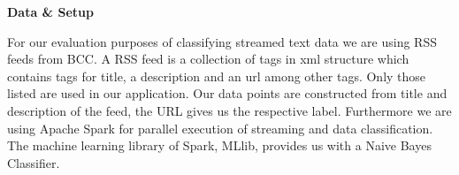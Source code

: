 \begin{center} \textbf{\huge Data \& Setup} \end{center}
For our evaluation purposes of classifying streamed text data we are using RSS feeds from BCC. A RSS feed is a collection of tags in xml structure which contains tags for title, a description and an url among other tags. Only those listed are used in our application. Our data points are constructed from title and description of the feed, the URL gives us the respective label. Furthermore we are using Apache Spark for parallel execution of streaming and data classification. The machine learning library of Spark, MLlib, provides us with a Naive Bayes Classifier.
  

